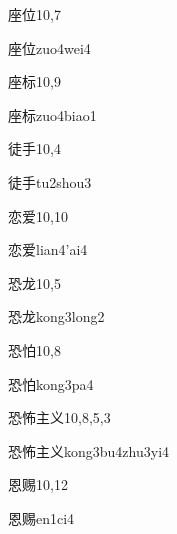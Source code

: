 \begin{entry}{座位}{10,7}
  \begin{phonetics}{座位}{zuo4wei4}
  \end{phonetics}
\end{entry}

\begin{entry}{座标}{10,9}
  \begin{phonetics}{座标}{zuo4biao1}
  \end{phonetics}
\end{entry}

\begin{entry}{徒手}{10,4}
  \begin{phonetics}{徒手}{tu2shou3}
  \end{phonetics}
\end{entry}

\begin{entry}{恋爱}{10,10}
  \begin{phonetics}{恋爱}{lian4'ai4}
  \end{phonetics}
\end{entry}

\begin{entry}{恐龙}{10,5}
  \begin{phonetics}{恐龙}{kong3long2}
  \end{phonetics}
\end{entry}

\begin{entry}{恐怕}{10,8}
  \begin{phonetics}{恐怕}{kong3pa4}
  \end{phonetics}
\end{entry}

\begin{entry}{恐怖主义}{10,8,5,3}
  \begin{phonetics}{恐怖主义}{kong3bu4zhu3yi4}
  \end{phonetics}
\end{entry}

\begin{entry}{恩赐}{10,12}
  \begin{phonetics}{恩赐}{en1ci4}
  \end{phonetics}
\end{entry}

